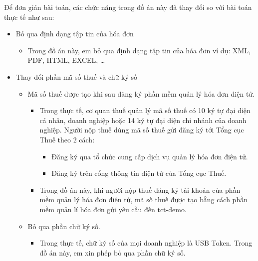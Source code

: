 Để đơn giản   bài toán, các chức năng trong đồ án này đã thay đổi so với bài toán thực tế như sau:

\begin{itemize}

\item Bỏ qua định dạng tập tin của hóa đơn

\begin{itemize}

\item Trong đồ án này, em bỏ qua định dạng tập tin của hóa đơn ví dụ: XML, PDF, HTML, EXCEL, \dots

\end{itemize}

\item Thay đổi phần mã số thuế và chữ ký số

\begin{itemize}

\item Mã số thuế được tạo khi sau đăng ký phần mềm quản lý hóa đơn điện tử.

\begin{itemize}

\item Trong thực tế, cơ quan thuế quản lý mã số thuế có 10 ký tự đại diện cá nhân, doanh nghiệp hoặc 14 ký tự đại diện chi nhánh của doanh nghiệp. Người nộp thuế dùng mã số thuế gửi đăng ký tới Tổng cục Thuế theo 2 cách:

\begin{itemize}

\item Đăng ký qua tổ chức cung cấp dịch vụ quản lý hóa đơn điện tử.

\item Đăng ký trên cổng thông tin điện tử của Tổng cục Thuế.

\end{itemize}

\item Trong đồ án này, khi người nộp thuế đăng ký tài khoản của phần mềm quản lý hóa đơn điện tử, mã số thuế được tạo bằng cách phần mềm quản lí hóa đơn gửi yêu cầu đến tct-demo.

\end{itemize}

\item Bỏ qua phần chữ ký số.

\begin{itemize}

\item Trong thực tế, chữ ký số của mọi doanh nghiệp là USB Token. Trong đồ án này, em xin phép bỏ qua phần chữ ký số.


\end{itemize}
\end{itemize}
\end{itemize}
